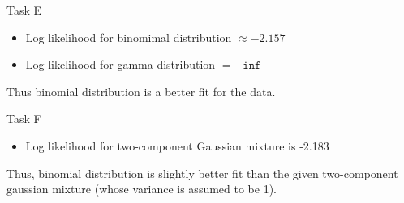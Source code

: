 \begin{task}{Task E}
	\begin{itemize}
		\item Log likelihood for binomimal distribution $\approx -2.157$
		\item Log likelihood for gamma distribution $= -\texttt{inf}$
	\end{itemize}
	Thus binomial distribution is a better fit for the data.
\end{task}

\begin{task}{Task F}
	\begin{itemize}
		\item Log likelihood for two-component Gaussian mixture is -2.183
	\end{itemize}
	Thus, binomial distribution is slightly better fit than the given
	two-component gaussian mixture (whose variance is assumed to be 1).
\end{task}
